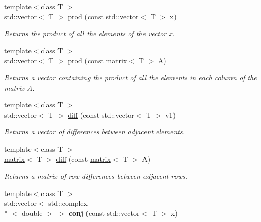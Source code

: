 \begin{DoxyCompactItemize}
\item 
\hypertarget{namespacekeycpp_a18c262cc7b63b53f3d4c9fbeda591088}{{\footnotesize template$<$class T $>$ }\\std\-::vector$<$ T $>$ \hyperlink{namespacekeycpp_a18c262cc7b63b53f3d4c9fbeda591088}{prod} (const std\-::vector$<$ T $>$ x)}\label{namespacekeycpp_a18c262cc7b63b53f3d4c9fbeda591088}

\begin{DoxyCompactList}\small\item\em Returns the product of all the elements of the vector x. \end{DoxyCompactList}\item 
\hypertarget{namespacekeycpp_a0b348cee175715d20a1997b471c47d7a}{{\footnotesize template$<$class T $>$ }\\std\-::vector$<$ T $>$ \hyperlink{namespacekeycpp_a0b348cee175715d20a1997b471c47d7a}{prod} (const \hyperlink{classkeycpp_1_1matrix}{matrix}$<$ T $>$ A)}\label{namespacekeycpp_a0b348cee175715d20a1997b471c47d7a}

\begin{DoxyCompactList}\small\item\em Returns a vector containing the product of all the elements in each column of the matrix A. \end{DoxyCompactList}\item 
\hypertarget{namespacekeycpp_aa4d7bfe3e5ee5f1b805e9aa64c5ba1e9}{{\footnotesize template$<$class T $>$ }\\std\-::vector$<$ T $>$ \hyperlink{namespacekeycpp_aa4d7bfe3e5ee5f1b805e9aa64c5ba1e9}{diff} (const std\-::vector$<$ T $>$ v1)}\label{namespacekeycpp_aa4d7bfe3e5ee5f1b805e9aa64c5ba1e9}

\begin{DoxyCompactList}\small\item\em Returns a vector of differences between adjacent elements. \end{DoxyCompactList}\item 
{\footnotesize template$<$class T $>$ }\\\hyperlink{classkeycpp_1_1matrix}{matrix}$<$ T $>$ \hyperlink{namespacekeycpp_a0cf08572a2b7b23b6be5365053770fa5}{diff} (const \hyperlink{classkeycpp_1_1matrix}{matrix}$<$ T $>$ A)
\begin{DoxyCompactList}\small\item\em Returns a matrix of row differences between adjacent rows. \end{DoxyCompactList}\item 
\hypertarget{namespacekeycpp_ad26d6a2ad64185a749c6f2e85aeaf62b}{{\footnotesize template$<$class T $>$ }\\std\-::vector$<$ std\-::complex\\*
$<$ double $>$ $>$ {\bfseries conj} (const std\-::vector$<$ T $>$ x)}\label{namespacekeycpp_ad26d6a2ad64185a749c6f2e85aeaf62b}


\end{DoxyCompactItemize}
